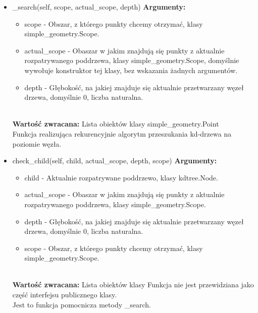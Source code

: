 \documentclass{article}
\begin{document}
\begin{itemize}
                    
                    \item \_search(self, scope, actual\_scope, depth)
                        \textbf{Argumenty:} \begin{itemize}
                            \item scope - Obszar, z którego punkty chcemy otrzymać, klasy simple\_geometry.Scope. 
                            \item actual\_scope - Obaszar w jakim znajdują się punkty z aktualnie rozpatrywanego poddrzewa, klasy simple\_geometry.Scope, domyślnie wywołuje konstruktor tej klasy, bez wskazania żadnych argumentów. 
                            \item depth - Głębokość, na jakiej znajduje się aktualnie przetwarzany węzeł drzewa, domyślnie 0, liczba naturalna. 
                            \end{itemize}\\
                        \textbf{Wartość zwracana:} Lista obiektów klasy simple\_geometry.Point\\
                        Funkcja realizująca rekurencyjnie algorytm przeszukania kd-drzewa na poziomie węzła. 
                    
                    
                    \item check\_child(self, child, actual\_scope, depth, scope)
                        \textbf{Argumenty:} \begin{itemize}
                            \item child - Aktualnie rozpatrywane poddrzewo, klasy kdtree.Node.
                            \item actual\_scope - Obaszar w jakim znajdują się punkty z aktualnie rozpatrywanego poddrzewa, klasy simple\_geometry.Scope.
                            \item depth - Głębokość, na jakiej znajduje się aktualnie przetwarzany węzeł drzewa, domyślnie 0, liczba naturalna. 
                            \item scope - Obszar, z którego punkty chcemy otrzymać, klasy simple\_geometry.Scope. 
                            \end{itemize}\\
                        \textbf{Wartość zwracana:} Lista obiektów klasy
                        Funkcja nie jest przewidziana jako część interfejsu publicznego klasy. \\
                        Jest to funkcja pomocnicza metody \_search. 
                    
                \end{itemize}
\end{document}
